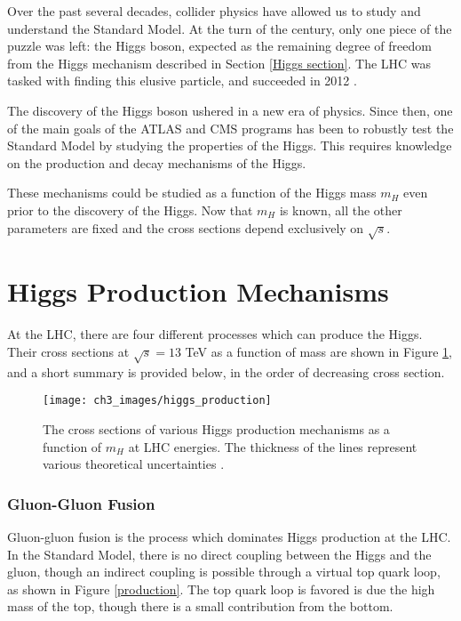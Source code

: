 \documentclass[10pt,a4paper]{book}
\begin{document}
Over the past several decades, collider physics have allowed us to study and understand the Standard Model. At the turn of the century, only one piece of the puzzle was left: the Higgs boson, expected as the remaining degree of freedom from the Higgs mechanism described in Section \ref{Higgs section}. The LHC was tasked with finding this elusive particle, and succeeded in 2012 \cite{ATLAS:2012yve, CMS:2012qbp}.

The discovery of the Higgs boson ushered in a new era of physics. Since then, one of the main goals of the ATLAS and CMS programs has been to robustly test the Standard Model by studying the properties of the Higgs. This requires knowledge on the production and decay mechanisms of the Higgs. 

These mechanisms could be studied as a function of the Higgs mass $m_{H}$ even prior to the discovery of the Higgs. Now that $m_{H}$ is known, all the other parameters are fixed and the cross sections depend exclusively on $\sqrt{s}$. 

\section{Higgs Production Mechanisms}

At the LHC, there are four different processes which can produce the Higgs. Their cross sections at $\sqrt{s} = 13$ TeV as a function of mass are shown in Figure \ref{Higgs production}, and a short summary is provided below, in the order of decreasing cross section.

\begin{figure}
\centering
\texttt{[image: ch3\_images/higgs\_production]}
\caption{The cross sections of various Higgs production mechanisms as a function of $m_H$ at LHC energies. The thickness of the lines represent various theoretical uncertainties \cite{LHCHiggsCrossSectionWorkingGroup:2016ypw}.}
\label{Higgs production}
\end{figure}

\subsubsection{Gluon-Gluon Fusion}
Gluon-gluon fusion is the process which dominates Higgs production at the LHC.
In the Standard Model, there is no direct coupling between the Higgs and the gluon, though an indirect coupling is possible through a virtual top quark loop, as shown in Figure \ref{production}. The top quark loop is favored is due the high mass of the top, though there is a small contribution from the bottom.
\end{document}
